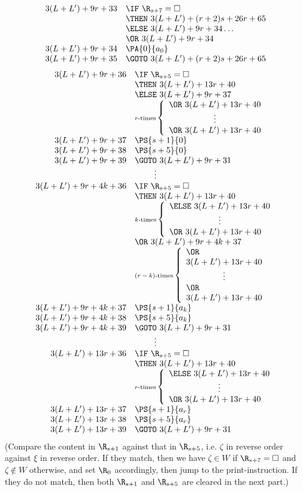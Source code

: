\begin{enumerate}[1.]
\begin{enumerate}[(a)]
\begin{enumerate}[(1)]
\[\begin{array}{rl}
3(L + L^\prime) + 9r + 33 & \IF \ \R_{s + 7} = \Box \cr
\ & \THEN \ 3(L + L^\prime) + (r + 2)s + 26r + 65 \cr
\ & \ELSE \ 3(L + L^\prime) + 9r + 34 \ldots \cr
\ & \OR \ 3(L + L^\prime) + 9r + 34 \cr
3(L + L^\prime) + 9r + 34 & \PA{0}{a_0} \cr
3(L + L^\prime) + 9r + 35 & \GOTO \ 3(L + L^\prime) + (r + 2)s + 26r + 65 \cr
\end{array}
\]
\[
\begin{array}{rl}
3(L + L^\prime) + 9r + 36 & \IF \ \R_{s + 5} = \Box \cr
\ & \THEN \ 3(L + L^\prime) + 13r + 40 \cr
\ & \ELSE \ 3(L + L^\prime) + 9r + 37 \cr
\ & \mbox{\scriptsize$r$-times}\left\{\begin{array}{l}
\OR \ 3(L + L^\prime) + 13r + 40 \cr
\multicolumn{1}{c}{\vdots} \cr
\OR \ 3(L + L^\prime) + 13r + 40
\end{array}\right. \cr
3(L + L^\prime) + 9r + 37 & \PS{s + 1}{0} \cr
3(L + L^\prime) + 9r + 38 & \PS{s + 5}{0} \cr
3(L + L^\prime) + 9r + 39 & \GOTO \ 3(L + L^\prime) + 9r + 31 \cr
\multicolumn{2}{c}{\vdots} \cr
3(L + L^\prime) + 9r + 4k + 36 & \IF \ \R_{s + 5} = \Box \cr
\ & \THEN \ 3(L + L^\prime) + 13r + 40 \cr
\ & \mbox{\scriptsize $k$-times}\left\{\begin{array}{l}
\ELSE \ 3(L + L^\prime) + 13r + 40 \cr
\multicolumn{1}{c}{\vdots} \cr
\OR \ 3(L + L^\prime) + 13r + 40
\end{array}\right. \cr
\ & \OR \ 3(L + L^\prime) + 9r + 4k + 37 \cr
\ & \mbox{\scriptsize $(r - k)$-times}\left\{\begin{array}{l}
\OR \cr
3(L + L^\prime) + 13r + 40 \cr
\multicolumn{1}{c}{\vdots} \cr
\OR \cr
3(L + L^\prime) + 13r + 40
\end{array}\right. \cr
3(L + L^\prime) + 9r + 4k + 37 & \PS{s + 1}{a_k} \cr
3(L + L^\prime) + 9r + 4k + 38 & \PS{s + 5}{a_k} \cr
3(L + L^\prime) + 9r + 4k + 39 & \GOTO \ 3(L + L^\prime) + 9r + 31 \cr
\multicolumn{2}{c}{\vdots} \cr
3(L + L^\prime) + 13r + 36 & \IF \ \R_{s + 5} = \Box \cr
\ & \THEN \ 3(L + L^\prime) + 13r + 40 \cr
\ & \mbox{\scriptsize $r$-times}\left\{\begin{array}{l}
\ELSE \ 3(L + L^\prime) + 13r + 40 \cr
\multicolumn{1}{c}{\vdots} \cr
\OR \ 3(L + L^\prime) + 13r + 40
\end{array}\right. \cr
3(L + L^\prime) + 13r + 37 & \PS{s + 1}{a_r} \cr
3(L + L^\prime) + 13r + 38 & \PS{s + 5}{a_r} \cr
3(L + L^\prime) + 13r + 39 & \GOTO \ 3(L + L^\prime) + 9r + 31
\end{array}
\]
(Compare the content in $\R_{s + 1}$ against that in $\R_{s + 5}$, i.e. $\zeta$ in reverse order against $\xi$ in reverse order. If they match, then we have $\zeta \in W$ if $\R_{s + 7} = \Box$ and $\zeta \not\in W$ otherwise, and set $\R_0$ accordingly, then jump to the print-instruction. If they do not match, then both $\R_{s + 1}$ and $\R_{s + 5}$ are cleared in the next part.)

\end{enumerate}
\end{enumerate}
\end{enumerate}
